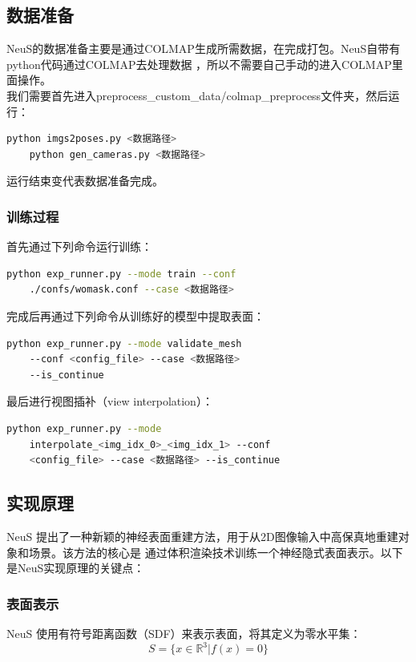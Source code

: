 \documentclass{nwputhesis}
\begin{document}
\subsection{数据准备}
\indent
NeuS的数据准备主要是通过COLMAP生成所需数据，在完成打包。NeuS自带有python代码通过COLMAP去处理数据
，所以不需要自己手动的进入COLMAP里面操作。\\
\indent
我们需要首先进入preprocess\_custom\_data/colmap\_preprocess文件夹，然后运行：
\begin{lstlisting}[language=bash]
    python imgs2poses.py <数据路径>
    python gen_cameras.py <数据路径>
\end{lstlisting}

\indent
运行结束变代表数据准备完成。

\subsubsection{训练过程}
\indent
首先通过下列命令运行训练：
\begin{lstlisting}[language=bash]
    python exp_runner.py --mode train --conf 
    ./confs/womask.conf --case <数据路径>
\end{lstlisting}

\indent
完成后再通过下列命令从训练好的模型中提取表面：
\begin{lstlisting}[language=bash]
    python exp_runner.py --mode validate_mesh 
    --conf <config_file> --case <数据路径> 
    --is_continue
\end{lstlisting}

\indent
最后进行视图插补（view interpolation）：
\begin{lstlisting}[language=bash]
    python exp_runner.py --mode 
    interpolate_<img_idx_0>_<img_idx_1> --conf 
    <config_file> --case <数据路径> --is_continue
\end{lstlisting}

\subsection{实现原理}
NeuS 提出了一种新颖的神经表面重建方法，用于从2D图像输入中高保真地重建对象和场景。该方法的核心是
通过体积渲染技术训练一个神经隐式表面表示。以下是NeuS实现原理的关键点：

\subsubsection{表面表示}
NeuS 使用有符号距离函数（SDF）来表示表面，将其定义为零水平集：
\[ S = \{x \in \mathbb{R}^3 | f(x) = 0\} \]
\end{document}
